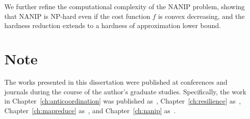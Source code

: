 We further refine the computational complexity of the NANIP problem, showing
that NANIP is NP-hard even if the cost function $f$ is convex decreasing, and
the hardness reduction extends to a hardness of approximation lower bound.

\section{Note}

The works presented in this dissertation were published at conferences and
journals during the course of the author's graduate studies. Specifically, the
work in Chapter~\ref{ch:anticoordination} was published as~\cite{KunPR13},
Chapter~\ref{ch:resilience} as~\cite{KunR14}, Chapter~\ref{ch:mapreduce}
as~\cite{FishKLRT15}, and Chapter~\ref{ch:nanip} as~\cite{GutfraindKLR15}.
